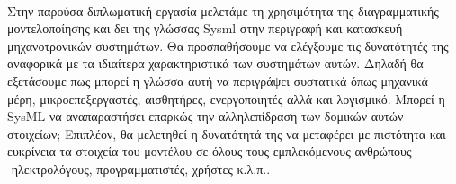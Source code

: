 \documentclass[a4paper, 12pt, twoside]{report}
\begin{document}
		\paragraph{}{Στην παρούσα διπλωματική εργασία μελετάμε τη χρησιμότητα της διαγραμματικής μοντελοποίησης και δει της γλώσσας Sysml στην περιγραφή και κατασκευή μηχανοτρονικών συστημάτων. Θα προσπαθήσουμε να ελέγξουμε τις δυνατότητές της αναφορικά με τα ιδιαίτερα χαρακτηριστικά των συστημάτων αυτών. Δηλαδή θα εξετάσουμε πως μπορεί η γλώσσα αυτή να περιγράψει συστατικά όπως μηχανικά μέρη, μικροεπεξεργαστές, αισθητήρες, ενεργοποιητές αλλά και λογισμικό. Μπορεί η SysML να αναπαραστήσει επαρκώς την αλληλεπίδραση των δομικών αυτών στοιχείων; Επιπλέον, θα μελετηθεί η δυνατότητά της να μεταφέρει με πιστότητα και ευκρίνεια τα στοιχεία του μοντέλου σε όλους τους εμπλεκόμενους ανθρώπους -ηλεκτρολόγους, προγραμματιστές, χρήστες κ.λ.π..
		}
\end{document}
